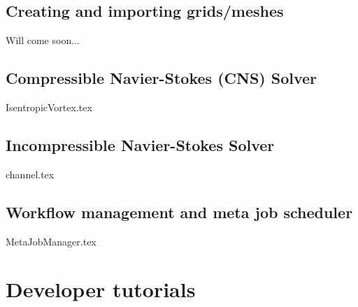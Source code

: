 \documentclass[a4paper,10pt]{report} %
\begin{document}
\chapter{Creating and importing grids/meshes }
\label{sec:GridCreation}
Will come soon...


\chapter{Compressible Navier-Stokes (CNS) Solver }
\label{CNS}
{IsentropicVortex.tex}


\chapter{Incompressible Navier-Stokes Solver}
\label{IBM}
{channel.tex}

\chapter{Workflow management and meta job scheduler}
\label{sec:WorkflowMgm}
{MetaJobManager.tex}

\part{Developer tutorials}
\label{sec:Tutorial}
\end{document}
